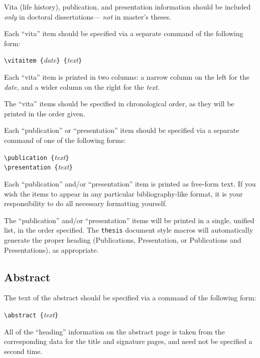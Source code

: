 Vita (life history), publication, and presentation information
should be included {\em only\/} in doctoral dissertations---%
{\em not\/} in master's theses.

Each ``vita'' item should be specified
via a separate command of the following form:

\begin {center}
\verb+\vitaitem {+{\sl date\/}\verb+} {+{\sl text\/}\verb+}+
\end {center}

Each ``vita'' item is printed in two columns:
a narrow column on the left for the {\sl date,}
and a wider column on the right for the {\sl text.}

The ``vita'' items should be specified in chronological order,
as they will be printed in the order given.

Each ``publication'' or ``presentation'' item
should be specified via a separate command
of one of the following forms:

\begin {center}
\verb+\publication {+{\sl text\/}\verb+}+ \\
\verb+\presentation {+{\sl text\/}\verb+}+
\end {center}

Each ``publication'' and/or ``presentation'' item
is printed as free-form text.
If you wish the items to appear in any particular
bibliography-like format,
it is your responsibility to do all necessary formatting yourself.

The ``publication'' and/or ``presentation'' items
will be printed in a single, unified list,
in the order specified.
The \verb+thesis+ document style macros
will automatically generate the proper heading
({\sc Publications}, {\sc Presentation},
or {\sc Publications and Presentations}),
as appropriate.

\subsection {Abstract}

The text of the abstract should be specified
via a command of the following form:

\begin {center}
\verb+\abstract {+{\sl text\/}\verb+}+
\end {center}

All of the ``heading'' information on the abstract page
is taken from the corresponding data
for the title and signature pages,
and need not be specified a second time.

